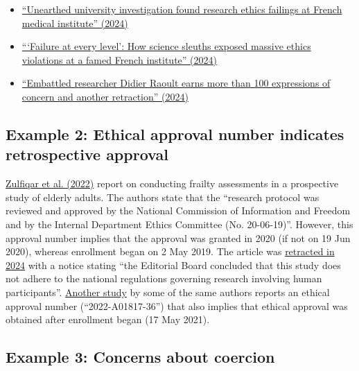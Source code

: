 \documentclass[letterpaper, 12pt]{article}
\begin{document}
\begin{itemize}
    \setlength\itemsep{-0.5em}
    \item \href{https://www.science.org/content/article/unearthed-university-investigation-found-research-ethics-failings-french-medical}{``Unearthed university investigation found research ethics failings at French medical institute'' (2024)}
    \item \href{https://www.science.org/content/article/failure-every-level-how-science-sleuths-exposed-massive-ethics-violations-famed-french}{```Failure at every level': How science sleuths exposed massive ethics violations at a famed French institute'' (2024)}
    \item \href{https://retractionwatch.com/2024/04/03/embattled-researcher-didier-raoult-earns-dozens-more-expressions-of-concern-and-another-retraction/}{``Embattled researcher Didier Raoult earns more than 100 expressions of concern and another retraction'' (2024)}
\end{itemize}

\subsection*{Example 2: Ethical approval number indicates retrospective approval}

\href{https://doi.org/10.3390/medicines9070038}{Zulfiqar et al. (2022)} report on conducting frailty assessments in a prospective study of elderly adults. The authors state that the ``research protocol was reviewed and approved by the National Commission of Information and Freedom and by the Internal Department Ethics Committee (No. 20-06-19)''. However, this approval number implies that the approval was granted in 2020 (if not on 19 Jun 2020), whereas enrollment began on 2 May 2019. The article was \href{https://doi.org/10.3390/medicines11080022}{retracted in 2024} with a notice stating ``the Editorial Board concluded that this study does not adhere to the national regulations governing research involving human participants''. \href{https://doi.org/10.3390/medicines9110058}{Another study} by some of the same authors reports an ethical approval number (``2022-A01817-36'') that also implies that ethical approval was obtained after enrollment began (17 May 2021).

\subsection*{Example 3: Concerns about coercion}
\end{document}

